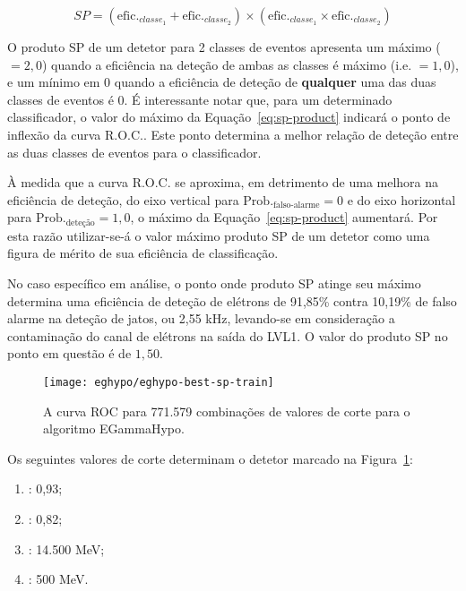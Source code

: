 \begin{equation}
SP = (\text{efic.}_{classe_1} + \text{efic.}_{classe_2}) \times
(\text{efic.}_{classe_1} \times \text{efic.}_{classe_2})
\label{eq:sp-product}
\end{equation}

O produto SP de um detetor para 2 classes de eventos apresenta um máximo
($=2,0$) quando a eficiência na deteção de ambas as classes é máximo
(i.e. $=1,0$), e um mínimo em $0$ quando a eficiência de deteção de
\textbf{qualquer} uma das duas classes de eventos é $0$. É interessante notar
que, para um determinado classificador, o valor do máximo da
Equação~\ref{eq:sp-product} indicará o ponto de inflexão da curva R.O.C.. Este
ponto determina a melhor relação de deteção entre as duas classes de eventos
para o classificador.

À medida que a curva R.O.C. se aproxima, em detrimento de uma melhora na
eficiência de deteção, do eixo vertical para $\text{Prob.}_\text{falso-alarme}
= 0$ e do eixo horizontal para $\text{Prob.}_\text{deteção} = 1,0$, o máximo
da Equação~\ref{eq:sp-product} aumentará. Por esta razão utilizar-se-á o valor
máximo produto SP de um detetor como uma figura de mérito de sua eficiência de
classificação.

No caso específico em análise, o ponto onde produto SP atinge seu máximo
determina uma eficiência de deteção de elétrons de 91,85\% contra 10,19\% de
falso alarme na deteção de jatos, ou 2,55 kHz, levando-se em consideração a
contaminação do canal de elétrons na saída do LVL1. O valor do produto SP no
ponto em questão é de $1,50$.

\begin{figure}
\begin{center}
\texttt{[image: eghypo/eghypo-best-sp-train]}
\end{center}
\caption{A curva ROC para 771.579 combinações de valores de corte para o
algoritmo EGammaHypo.}
\label{fig:eghypo-best-sp-train}
\end{figure}

Os seguintes valores de corte determinam o detetor marcado na
Figura~\ref{fig:eghypo-best-sp-train}:
\begin{enumerate}
\item \rcore: 0,93;
\item \eratio: 0,82;
\item \etem: 14.500 MeV;
\item \ethad: 500 MeV.
\end{enumerate}


